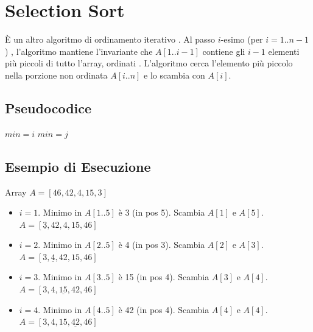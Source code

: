 \section{Selection Sort }
È un altro algoritmo di ordinamento iterativo .
Al passo $i$-esimo (per $i=1..n-1$) , l'algoritmo mantiene l'invariante che $A[1..i-1]$ contiene gli $i-1$ elementi più piccoli di tutto l'array, ordinati .
L'algoritmo cerca l'elemento più piccolo nella porzione non ordinata $A[i..n]$ e lo scambia con $A[i]$.

\subsection{Pseudocodice}
\begin{algorithmic}[1]
        \State $min = i$ 
             
                \State $min = j$ 
            \EndIf
        \EndFor
        \State {} 
    \EndFor
\EndProcedure
\end{algorithmic}

\subsection{Esempio di Esecuzione }

\begin{example}
Array $A = [46, 42, 4, 15, 3]$ 
\begin{itemize}
    \item $i=1$. Minimo in $A[1..5]$ è 3 (in pos 5). Scambia $A[1]$ e $A[5]$.
    $A = [\underline{3}, 42, 4, 15, 46]$ 
    \item $i=2$. Minimo in $A[2..5]$ è 4 (in pos 3). Scambia $A[2]$ e $A[3]$.
    $A = [3, \underline{4}, 42, 15, 46]$ 
    \item $i=3$. Minimo in $A[3..5]$ è 15 (in pos 4). Scambia $A[3]$ e $A[4]$.
    $A = [3, 4, \underline{15}, 42, 46]$ 
    \item $i=4$. Minimo in $A[4..5]$ è 42 (in pos 4). Scambia $A[4]$ e $A[4]$. $A = [3, 4, 15, \underline{42}, 46]$ 
\end{itemize}
\end{example}

\newpage